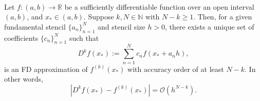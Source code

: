 \documentclass[12pt]{article}
\newcommand{\N}{\mathbb{N}}
\newcommand{\R}{\mathbb{R}}
\newcommand{\xstar}{x_*}
\newcommand{\FD}{D}
\begin{document}
%
\begin{theorem}\label{thm:stand_conv}
\\
Let $f:(a,b)\to\R$ be a sufficiently differentiable function over an open interval $(a,b)$, and $\xstar\in(a,b)$.
Suppose $k,N\in\N$ with $N-k\ge 1$.
Then, for a given fundamental stencil $\{a_n\}_{n=1}^N$ and stencil size $h>0$, there exists a unique set of coefficients $\{c_n\}_{n=1}^N$ such that
\begin{equation}\label{eq:FDappx}
	\FD^k f(\xstar) := \sum_{n=1}^N c_n f(\xstar+a_nh),
\end{equation}
is an FD approximation of $f^{(k)}(\xstar)$ with accuracy order of at least $N-k$.
In other words,
\[
	\left| \FD^k f(\xstar) - f^{(k)}(\xstar) \right| =\mathcal{O}(h^{N-k}).
\]
\end{theorem}
%
\end{document}

